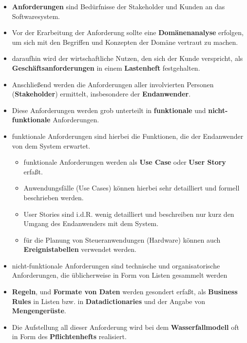 \begin{itemize}
    \item \textbf{Anforderungen} sind Bedürfnisse der Stakeholder und Kunden an das Softwaresystem.
    \item Vor der Erarbeitung der Anforderung sollte eine \textbf{Domänenanalyse} erfolgen, um sich mit den Begriffen und Konzepten der Domäne vertraut zu machen.
    \item daraufhin wird der wirtschaftliche Nutzen, den sich der Kunde verspricht, als \textbf{Geschäftsanforderungen} in einem \textbf{Lastenheft} festgehalten.
    \item Anschließend werden die Anforderungen aller involvierten Personen (\textbf{Stakeholder}) ermittelt, insbesondere der \textbf{Endanwender}.
    \item Diese Anforderungen werden grob unterteilt in \textbf{funktionale} und \textbf{nicht-funktionale} Anforderungen.
    \item funktionale Anforderungen sind hierbei die Funktionen, die der Endanwender von dem System erwartet.
    \begin{itemize}
        \item funktionale Anforderungen werden als \textbf{Use Case} oder \textbf{User Story} erfaßt.
        \item Anwendungsfälle (Use Cases) können hierbei sehr detailliert und formell beschrieben werden.
        \item User Stories sind i.d.R. wenig detailliert und beschreiben nur kurz den Umgang des Endanwenders mit dem System.
        \item für die Planung von Steueranwendungen (Hardware) können auch \textbf{Ereignistabellen} verwendet werden.
    \end{itemize}
    \item nicht-funktionale Anforderungen sind technische und organisatorische Anforderungen, die üblicherweise in Form von Listen gesammelt werden
    \item \textbf{Regeln}, und \textbf{Formate von Daten} werden gesondert erfaßt, als \textbf{Business Rules} in Listen bzw. in \textbf{Datadictionaries} und der Angabe von \textbf{Mengengerüste}.
    \item Die Aufstellung all dieser Anforderung wird bei dem \textbf{Wasserfallmodell} oft in Form des \textbf{Pflichtenhefts} realisiert.
\end{itemize}
